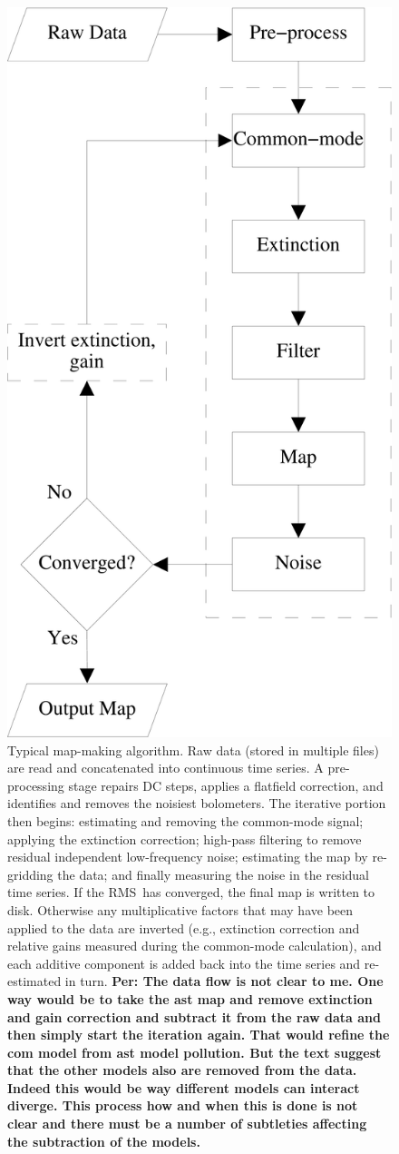 \documentclass[useAMS,usenatbib,nofootinbib]{mn2e}
\newcommand{\rms}{RMS}
\begin{document}
\begin{figure}
\centering
\includegraphics[width=0.75\linewidth]{dimm.pdf}
\caption{Typical map-making algorithm. Raw data (stored in multiple
  files) are read and concatenated into continuous time series. A
  pre-processing stage repairs DC steps, applies a flatfield
  correction, and identifies and removes the noisiest bolometers. The
  iterative portion then begins: estimating and removing the
  common-mode signal; applying the extinction correction; high-pass
  filtering to remove residual independent low-frequency noise;
  estimating the map by re-gridding the data; and finally measuring
  the noise in the residual time series. If the \rms\ has converged,
  the final map is written to disk. Otherwise any multiplicative
  factors that may have been applied to the data are inverted (e.g.,
  extinction correction and relative gains measured during the
  common-mode calculation), and each additive component is added back
  into the time series and re-estimated in turn.  {\bf Per: The data
  flow is not clear to me. One way would be to take the ast map and
  remove extinction and gain correction and subtract it from the raw
  data and then simply start the iteration again. That would refine
  the com model from ast model pollution. But the text suggest that
  the other models also are removed from the data. Indeed this would
  be way different models can interact diverge. This process how and
  when this is done is not clear and there must be a number of
  subtleties affecting the subtraction of the models.}}
\label{fig:dimm}
\end{figure}
\end{document}
